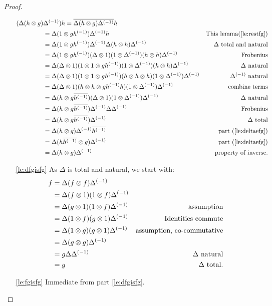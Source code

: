 \begin{proof}
\begin{enumerate}[{(}i{)}]
\begin{align*}
        (\Delta (h \otimes g) &{\Delta}^{(-1)})h  = \overline{\Delta (h \otimes g) {\Delta}^{(-1)}}h&\\
        &=\Delta(1 \otimes g {h}^{(-1)}) {\Delta}^{(-1)}h&\text{This lemma(\ref{le:restfg})}\\
        &=\Delta(1 \otimes g {h}^{(-1)}) {\Delta}^{(-1)}\Delta(h\otimes h){\Delta}^{(-1)}&\Delta\text{ total and natural}\\
        &=\Delta(1 \otimes g {h}^{(-1)}) (\Delta \otimes 1)(1\otimes{\Delta}^{(-1)})(h\otimes h){\Delta}^{(-1)}&\text{Frobenius}\\
        &=\Delta(\Delta\otimes1)(1\otimes1\otimes g{h}^{(-1)})(1\otimes{\Delta}^{(-1)}) (h\otimes h){\Delta}^{(-1)}&\Delta \text{ natural}\\
        &=\Delta(\Delta\otimes1)(1\otimes1\otimes g{h}^{(-1)})(h\otimes h\otimes h)(1\otimes{\Delta}^{(-1)}) {\Delta}^{(-1)}&{\Delta}^{(-1)}\text{ natural}\\
        &=\Delta(\Delta\otimes1)(h\otimes h\otimes g{h}^{(-1)}h)(1\otimes{\Delta}^{(-1)}) {\Delta}^{(-1)}&\text{combine terms}\\
        &=\Delta(h\otimes g\overline{{h}^{(-1)}})(\Delta\otimes1)(1\otimes{\Delta}^{(-1)}){\Delta}^{(-1)} &\Delta \text{ natural}\\
        &=\Delta(h\otimes g\overline{{h}^{(-1)}}){\Delta}^{(-1)}\Delta{\Delta}^{(-1)} &\text{Frobenius}\\
        &=\Delta(h \otimes g \overline{{h}^{(-1)}}){\Delta}^{(-1)}&\Delta \text{ total}\\
        &=\Delta(h \otimes g ){\Delta}^{(-1)}\overline{{h}^{(-1)}}& \text{part (\ref{le:deltaefg})}\\
        &=\Delta(h\overline{{h}^{(-1)}}\otimes g){\Delta}^{(-1)}&\text{part (\ref{le:deltaefg})}\\
        &=\Delta(h\otimes g){\Delta}^{(-1)}&\text{property of inverse}.
      \end{align*}

    \item[\ref{le:dfgisfg}]As $\Delta$ is total and natural, we start with:
      \begin{align*}
        f&=\Delta(f\otimes f){\Delta}^{(-1)}  & \\
        &= \Delta(f\otimes1)(1\otimes f){\Delta}^{(-1)} &  \\
        &= \Delta(g\otimes1)(1\otimes f){\Delta}^{(-1)} &\text{assumption} \\
        &= \Delta(1\otimes f)(g\otimes1){\Delta}^{(-1)} &\text{Identities commute}\\
        &= \Delta(1\otimes g)(g\otimes1){\Delta}^{(-1)} &\text{assumption, co-commutative}\\
        &= \Delta(g\otimes g){\Delta}^{(-1)} \\
        &= g\Delta{\Delta}^{(-1)} & \Delta \text{ natural}\\
        &= g&\Delta\text{ total}.
      \end{align*}
    \item[\ref{le:fgisfg}] Immediate from part \vref{le:dfgisfg}.
  \end{enumerate}
\end{proof}

